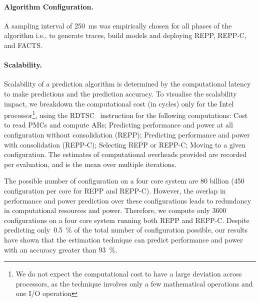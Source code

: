 
\paragraph{Algorithm Configuration.} A sampling interval of \SI{250}{\milli\second} was empirically chosen for
all phases of the algorithm i.e., to generate traces, build models and deploying REPP,
REPP-C, and FACTS.



\paragraph{Scalability.} Scalability of a prediction algorithm is determined by the computational latency to make
predictions and the prediction accuracy. To visualise the scalability impact, we breakdown
the computational cost (in cycles) only for the Intel processor\footnote{We do not expect
the computational cost to have a large deviation across processors, as the technique
involves only a few mathematical operations and one I/O operation}, using the
\textsf{RDTSC}~\citep{RDTSC} instruction for the following computations: {\small
{}} Cost to read PMCs and compute ARs; {\small {}} Predicting
performance and power at all configuration without consolidation (REPP); {\small
{}} Predicting performance and power with consolidation (REPP-C); {\small
{}} Selecting REPP or REPP-C; {\small {}} Moving to a given
configuration. The estimates of computational overheads provided are recorded per
evaluation, and is the mean over multiple iterations.

The possible number of configuration on a four core system are 80 billion (450
configuration per core for REPP and REPP-C).  However, the overlap in performance and
power prediction over these configurations leads to redundancy in computational resources
and power. Therefore, we compute only 3600 configurations on a four core system running
both REPP and REPP-C.  Despite predicting only~\SI{0.5}{\percent} of the total number of
configuration possible, our results have shown that the estimation technique can predict
performance and power with an accuracy greater than \SI{93}{\percent}.  


